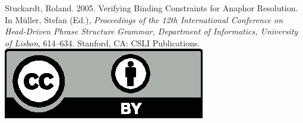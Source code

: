 \documentclass[11pt,a4paper,fleqn]{article}
\begin{document}
\noindent



\vfill
\noindent
Stuckardt, Roland. 2005. Verifying Binding Constraints for Anaphor Resolution. In Müller, Stefan (Ed.), \emph{{Proceedings of the 12th International Conference on Head-Driven Phrase Structure Grammar, Department of Informatics, University of Lisbon}}, 614--634. Stanford,
CA: CSLI Publications. \hfill\href{http://creativecommons.org/licenses/by/4.0/}{\includegraphics[height=.75em]{Includes/ccby.eps}}

\newpage

\end{document}
